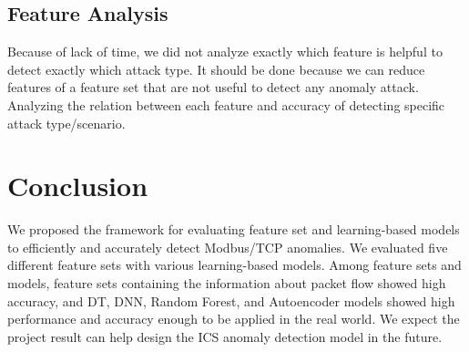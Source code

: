 \documentclass[fontsize=10pt]{article}
\begin{document}
\subsection{Feature Analysis} 
Because of lack of time, we did not analyze exactly which feature is helpful to detect exactly which attack type. It should be done because we can reduce features of a feature set that are not useful to detect any anomaly attack. Analyzing the relation between each feature and accuracy of detecting specific attack type/scenario.

\section{Conclusion}
We proposed the framework for evaluating feature set and learning-based models to efficiently and accurately detect Modbus/TCP anomalies. We evaluated five different feature sets with various learning-based models. Among feature sets and models, feature sets containing the information about packet flow showed high accuracy, and DT, DNN, Random Forest, and Autoencoder models showed high performance and accuracy enough to be applied in the real world. We expect the project result can help design the ICS anomaly detection model in the future.



\end{document}
